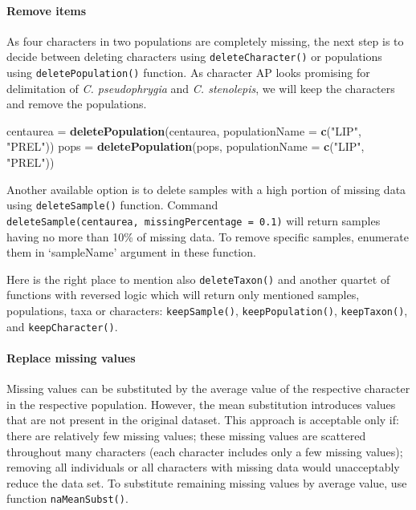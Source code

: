 \documentclass[
]{article}
\newenvironment{Shaded}{\begin{snugshade}}{\end{snugshade}}
\newcommand{\DataTypeTok}[1]{\textcolor[rgb]{0.13,0.29,0.53}{#1}}
\newcommand{\KeywordTok}[1]{\textcolor[rgb]{0.13,0.29,0.53}{\textbf{#1}}}
\newcommand{\NormalTok}[1]{#1}
\newcommand{\StringTok}[1]{\textcolor[rgb]{0.31,0.60,0.02}{#1}}
\begin{document}
\hypertarget{remove-items}{%
\paragraph{Remove items}\label{remove-items}}

As four characters in two populations are completely missing, the next
step is to decide between deleting characters using
\texttt{deleteCharacter()} or populations using
\texttt{deletePopulation()} function. As character AP looks promising
for delimitation of \emph{C. pseudophrygia} and \emph{C. stenolepis}, we
will keep the characters and remove the populations.

\begin{Shaded}
\begin{Highlighting}[]
\NormalTok{centaurea =}\StringTok{ }\KeywordTok{deletePopulation}\NormalTok{(centaurea, }\DataTypeTok{populationName =} \KeywordTok{c}\NormalTok{(}\StringTok{"LIP"}\NormalTok{, }\StringTok{"PREL"}\NormalTok{))}
\NormalTok{pops =}\StringTok{ }\KeywordTok{deletePopulation}\NormalTok{(pops, }\DataTypeTok{populationName =} \KeywordTok{c}\NormalTok{(}\StringTok{"LIP"}\NormalTok{, }\StringTok{"PREL"}\NormalTok{))}
\end{Highlighting}
\end{Shaded}

Another available option is to delete samples with a high portion of
missing data using \texttt{deleteSample()} function. Command
\texttt{deleteSample(centaurea,\ missingPercentage\ =\ 0.1)} will return
samples having no more than 10\% of missing data. To remove specific
samples, enumerate them in `sampleName' argument in these function.

Here is the right place to mention also \texttt{deleteTaxon()} and
another quartet of functions with reversed logic which will return only
mentioned samples, populations, taxa or characters:
\texttt{keepSample()}, \texttt{keepPopulation()}, \texttt{keepTaxon()},
and \texttt{keepCharacter()}.

\hypertarget{replace-missing-values}{%
\paragraph{Replace missing values}\label{replace-missing-values}}

Missing values can be substituted by the average value of the respective
character in the respective population. However, the mean substitution
introduces values that are not present in the original dataset. This
approach is acceptable only if: there are relatively few missing values;
these missing values are scattered throughout many characters (each
character includes only a few missing values); removing all individuals
or all characters with missing data would unacceptably reduce the data
set. To substitute remaining missing values by average value, use
function \texttt{naMeanSubst()}.
\end{document}
